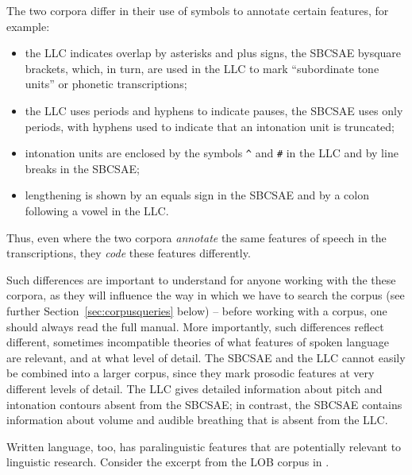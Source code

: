 The two corpora differ in their use of symbols to annotate  certain features, for example:
\begin{itemize}
\item the LLC  indicates overlap by asterisks and plus signs, the SBCSAE by\linebreak square brackets, which, in turn, are used in the LLC to mark ``subordinate tone units'' or phonetic  transcriptions;
\item the LLC  uses periods and hyphens to indicate pauses, the SBCSAE  uses only periods, with hyphens used to indicate that an intonation  unit is truncated;
\item intonation units are enclosed by the symbols \texttt{\^{}} and \texttt{\#} in the LLC  and by line breaks in the  SBCSAE;
\item lengthening is shown by an equals sign in the SBCSAE  and by a colon following a vowel  in the  LLC.
\end{itemize}

Thus, even where the two corpora \emph{annotate}  the same features of speech  in the transcriptions,  they \emph{code}  these features differently.

Such differences are important to understand for anyone working with the these corpora, as they will influence the way in which we have to search the corpus (see further Section~\ref{sec:corpusqueries} below) -- before working with a corpus, one should always read the full manual. More importantly, such differences reflect different, sometimes incompatible theories of what features of spoken  language are relevant, and at what level of detail. The SBCSAE  and the LLC  cannot easily be combined into a larger corpus, since they mark prosodic features at very different levels of detail. The LLC  gives detailed information about pitch and intonation  contours absent from the SBCSAE;  in contrast, the SBCSAE  contains information about volume and audible breathing that is absent from the  LLC.

 Written  language, too, has paralinguistic  features that are potentially relevant to linguistic research. Consider the excerpt from the LOB  corpus in .

